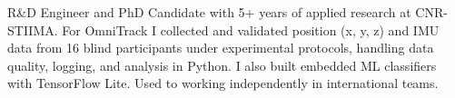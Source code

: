 {R\&D Engineer and PhD Candidate with 5+ years of applied research at CNR-STIIMA. For OmniTrack I collected and validated position (x, y, z) and IMU data from 16 blind participants under experimental protocols, handling data quality, logging, and analysis in Python. I also built embedded ML classifiers with TensorFlow Lite. Used to working independently in international teams.}

